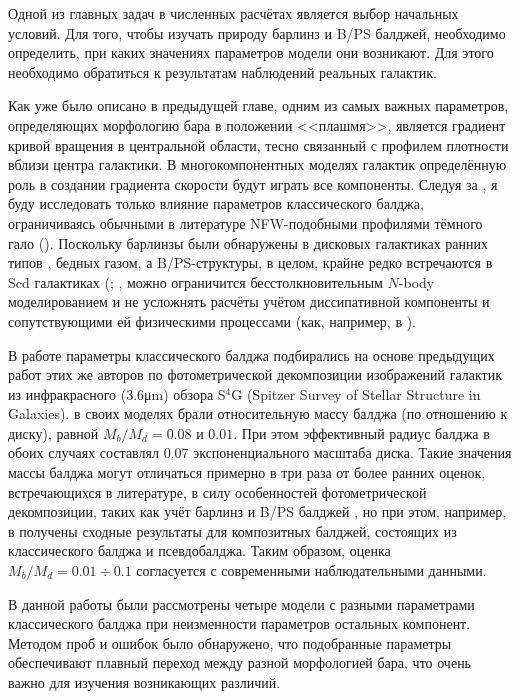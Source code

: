 \documentclass{trlnotes}
\begin{document}
Одной из главных задач в численных расчётах является выбор начальных 
условий. Для того, чтобы изучать
природу барлинз и B/PS балджей, необходимо определить, при каких значениях параметров модели они возникают. Для
этого необходимо обратиться к результатам наблюдений реальных галактик.

Как уже было описано в предыдущей главе, одним из самых важных параметров, определяющих морфологию бара в положении <<плашмя>>,
является градиент кривой вращения в центральной области, тесно связанный с профилем плотности вблизи центра галактики. В многокомпонентных моделях галактик определённую роль в создании градиента скорости будут играть все компоненты. Следуя за \citet{salo2017}, я буду исследовать только влияние параметров классического балджа, 
ограничиваясь обычными в литературе NFW-подобными профилями тёмного гало (\cite{navarro1996}). Поскольку барлинзы были обнаружены в 
дисковых галактиках ранних типов \citep{laurikainen2011}, бедных газом, а B/PS-структуры, в целом, крайне редко 
встречаются в Scd галактиках (\cite{erwin2017}; \cite{li2017a}, можно ограничится бесстолкновительным $N$-body моделированием и не усложнять расчёты учётом 
диссипативной компоненты и сопутствующими ей физическими процессами (как, например, в \cite{athanassoula2015}). 

В работе \citet{salo2017} параметры классического балджа подбирались на основе предыдущих работ этих же авторов по 
фотометрической декомпозиции изображений галактик из инфракрасного (3.6\thinspace μm) обзора S${}^4$G (Spitzer Survey of 
Stellar Structure in Galaxies). \citep{salo2015} в своих моделях брали относительную массу балджа (по отношению к диску), равной  
$M_b/M_d = 0.08$ и $0.01$. При этом эффективный радиус балджа в обоих случаях составлял $0.07$ экспоненциального 
масштаба диска. Такие значения массы балджа могут отличаться примерно в три раза от более ранних оценок, 
встречающихся в литературе, в силу особенностей фотометрической декомпозиции, таких как учёт барлинз и B/PS 
балджей \citep{laurikainen2016a}, но при этом, например, в \citet{erwin2015} получены сходные результаты для 
композитных балджей, состоящих из классического балджа и псевдобалджа. Таким образом, оценка $M_b/M_d = 0.01 \div 
0.1$ согласуется с современными наблюдательными данными.

В данной работы были рассмотрены четыре модели с разными параметрами 
классического балджа при неизменности параметров остальных 
компонент.  Методом проб и ошибок было обнаружено, что подобранные 
параметры обеспечивают плавный переход между разной морфологией 
бара, что очень важно для изучения возникающих различий. 
\end{document}
